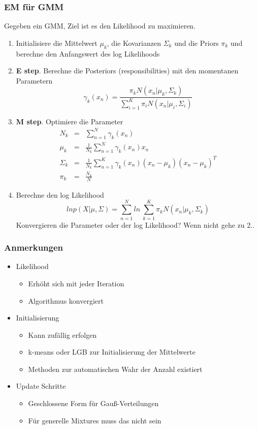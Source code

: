 	\subsubsection{EM für GMM}
	Gegeben ein GMM, Ziel ist es den Likelihood zu maximieren.
	\begin{enumerate}
		\item Initialisiere die Mittelwert $\mu_k$, die Kovarianzen $\Sigma_k$ und die Priors $\pi_k$ und berechne den  Anfangswert des log Likelihoods
		\item \textbf{E step}. Berechne die Posteriors (responsibilities) mit den momentanen Parametern
		\begin{equation*}
			\gamma_k(x_n) = \frac{\pi_kN(x_n\vert \mu_k, \Sigma_k)}{\sum_{i=1}^K\pi_iN(x_n\vert \mu_i,\Sigma_i)}
		\end{equation*}
		\item \textbf{M step}. Optimiere die Parameter
		\begin{eqnarray*}
			N_k &=& \sum_{n=1}^N\gamma_k(x_n)\\
			\mu_k &=& \frac{1}{N_k}\sum_{n=1}^N\gamma_k(x_n)x_n\\
			\Sigma_k &=& \frac{1}{N_k}\sum_{n=1}^K\gamma_k(x_n)(x_n-\mu_k)(x_n-\mu_k)^T\\
			\pi_k &=& \frac{N_k}{N}
		\end{eqnarray*}
		\item Berechne den log Likelihood
		\begin{equation*}
			ln p(X\vert\mu, \Sigma) = \sum_{n=1}^Nln~\sum_{k=1}^K\pi_kN(x_n\vert \mu_k,\Sigma_k)
		\end{equation*}
		Konvergieren die Parameter oder der log Likelihood? Wenn nicht gehe zu 2..
	\end{enumerate}
	\subsubsection{Anmerkungen}
	\begin{itemize}
		\item Likelihood
		\begin{itemize}
			\item Erhöht sich mit jeder Iteration
			\item Algorithmus konvergiert
		\end{itemize}
		\item Initialisierung
		\begin{itemize}
			\item Kann zufällig erfolgen
			\item k-means oder LGB zur Initialisierung der Mittelwerte
			\item Methoden zur automatischen Wahr der Anzahl existiert
		\end{itemize}
		\item Update Schritte
		\begin{itemize}
			\item Geschlossene Form für Gauß-Verteilungen
			\item Für generelle Mixtures muss das nicht sein
		\end{itemize}
	\end{itemize}